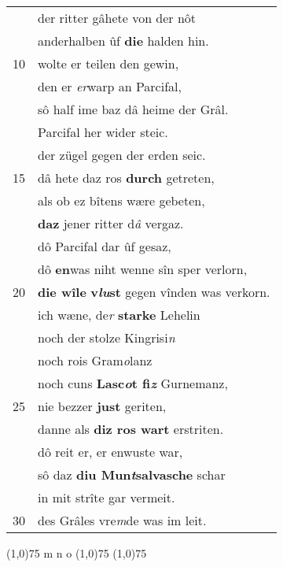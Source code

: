 \documentclass[8pt,a4paper,notitlepage]{article}
\begin{document}
\begin{table}[ht]
\begin{minipage}[t]{0.5\linewidth}
\begin{tabular}{rl}
 & der ritter gâhete von der nôt\\ 
 & anderhalben ûf \textbf{die} halden hin.\\ 
10 & wolte er teilen den gewin,\\ 
 & den er \textit{er}warp an Parcifal,\\ 
 & sô half ime baz dâ heime der Grâl.\\ 
 & Parcifal her wider steic.\\ 
 & der zügel gegen der erden seic.\\ 
15 & dâ hete daz ros \textbf{durch} getreten,\\ 
 & als ob ez bîtens wære gebeten,\\ 
 & \textbf{daz} jener ritter d\textit{â} vergaz.\\ 
 & dô Parcifal dar ûf gesaz,\\ 
 & dô \textbf{en}was niht wenne sîn sper verlorn,\\ 
20 & \textbf{die wîle} \textbf{v\textit{lu}st} gegen vînden was verkorn.\\ 
 & ich wæne, de\textit{r} \textbf{starke} Lehelin\\ 
 & noch der stolze Kingrisi\textit{n}\\ 
 & noch rois Gram\textit{o}lanz\\ 
 & noch cuns \textbf{Lasc\textit{o}t fi\textit{z}} Gurnemanz,\\ 
25 & nie bezzer \textbf{just} geriten,\\ 
 & danne als \textbf{diz ros wart} erstriten.\\ 
 & dô reit er, er enwuste war,\\ 
 & sô daz \textbf{diu Mun\textit{t}salvasche} schar\\ 
 & in mit strîte gar vermeit.\\ 
30 & des Grâles vre\textit{m}de was im leit.\\ 
\end{tabular}
\scriptsize
\line(1,0){75} \newline
m n o \newline
\line(1,0){75} \newline
\newline
\line(1,0){75} \newline

\end{minipage}
\end{table}
\end{document}
